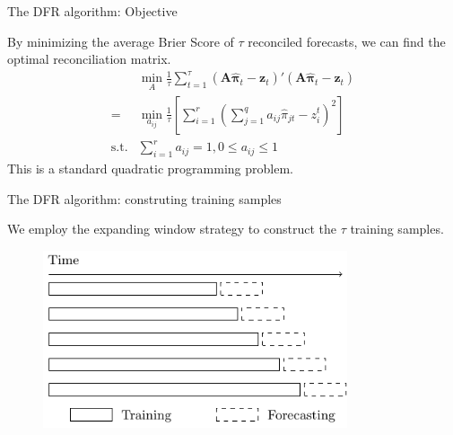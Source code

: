 \documentclass[12pt]{beamer}
\begin{document}
\begin{frame}{The DFR algorithm: Objective}
    \begin{outline}
        \0 By minimizing the average Brier Score of $\tau$ reconciled forecasts, we can find the optimal reconciliation matrix.
        \[
            \begin{aligned}
          &\min_{A}\frac{1}{\tau}\sum_{t=1}^{\tau}(\mathbf{A}\hat{\boldsymbol{\pi}}_t - \mathbf{z}_t)'(\mathbf{A}\hat{\boldsymbol{\pi}}_t - \mathbf{z}_t) \\
          =&\min_{a_{ij}}\frac{1}{\tau}\left[\sum_{i=1}^r\left(\sum_{j=1}^q a_{ij}\hat\pi_{jt} - z_i^t\right)^2\right] \\
          \text{s.t.} & \sum_{i=1}^r a_{ij} = 1, 0\leq a_{ij} \leq 1
            \end{aligned}
        \]
        \0 This is a standard quadratic programming problem.
    \end{outline}
\end{frame}


\begin{frame}{The DFR algorithm: construting training samples}

We employ the expanding window strategy to construct the $\tau$ training samples.

\begin{figure}
\includegraphics[width=0.8\textwidth]{../manuscript/figures/rolling_window.pdf}
\end{figure}
\end{frame}
\end{document}
